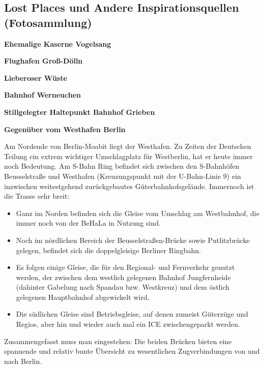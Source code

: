 \clearpage


\subsection{Lost Places und Andere Inspirationsquellen (Fotosammlung)}
\label{sec:personalAppendix_lostPlaces}

\textbf{Ehemalige Kaserne Vogelsang}


\textbf{Flughafen Gro{\ss}-D\"olln}


\textbf{Lieberoser W\"uste}


\textbf{Bahnhof Werneuchen}


\textbf{Stillgelegter Haltepunkt Bahnhof Grieben}


\textbf{Gegen\"uber vom Westhafen Berlin}

Am Nordende von Berlin-Moabit liegt der Westhafen.
Zu Zeiten der Deutschen Teilung ein extrem wichtiger Umschlagplatz f\"ur Westberlin, hat er heute immer noch Bedeutung.
Am S-Bahn Ring befindet sich zwischen den S-Bahnh\"ofen Beusselstra{\ss}e und Westhafen (Kreuzungspunkt mit der U-Bahn-Linie 9) ein inzwischen weitestgehend zur\"uckgebautes G\"uterbahnhofsgel\"ande.
Immernoch ist die Trasse sehr breit:
\begin{itemize}
	\item Ganz im Norden befinden sich die Gleise vom Umschlag am Westbahnhof, die immer noch von der BeHaLa in Nutzung sind.
	\item Noch im n\"ordlichen Bereich der Beusselstra{\ss}en-Br\"ucke sowie Putlitzbr\"ucke gelegen, befindet sich die doppelgleisige Berliner Ringbahn.
	\item Es folgen einige Gleise, die f\"ur den Regional- und Fernverkehr genutzt werden, der zwischen dem westlich gelegenen Bahnhof Jungfernheide (dahinter Gabelung nach Spandau bzw. Westkreuz) und dem \"ostlich gelegenen Hauptbahnhof abgewickelt wird.
	\item Die s\"udlichen Gleise sind Betriebsgleise, auf denen zumeist G\"uterz\"uge und Regios, aber hin und wieder auch mal ein ICE zwischengeparkt werden.
\end{itemize}
Zusammengefasst muss man eingestehen: Die beiden Br\"ucken bieten eine spannende und relativ bunte \"Ubersicht zu wesentlichen Zugverbindungen von und nach Berlin.

